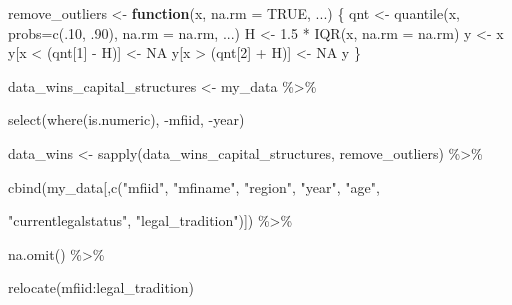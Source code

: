 \documentclass[a4paper,nobind]{templates/ociamthesis}
\newenvironment{Shaded}{\begin{snugshade}}{\end{snugshade}}
\newcommand{\AttributeTok}[1]{\textcolor[rgb]{0.77,0.63,0.00}{#1}}
\newcommand{\ConstantTok}[1]{\textcolor[rgb]{0.00,0.00,0.00}{#1}}
\newcommand{\ControlFlowTok}[1]{\textcolor[rgb]{0.13,0.29,0.53}{\textbf{#1}}}
\newcommand{\DecValTok}[1]{\textcolor[rgb]{0.00,0.00,0.81}{#1}}
\newcommand{\FloatTok}[1]{\textcolor[rgb]{0.00,0.00,0.81}{#1}}
\newcommand{\FunctionTok}[1]{\textcolor[rgb]{0.00,0.00,0.00}{#1}}
\newcommand{\NormalTok}[1]{#1}
\newcommand{\OtherTok}[1]{\textcolor[rgb]{0.56,0.35,0.01}{#1}}
\newcommand{\SpecialCharTok}[1]{\textcolor[rgb]{0.00,0.00,0.00}{#1}}
\newcommand{\StringTok}[1]{\textcolor[rgb]{0.31,0.60,0.02}{#1}}
\renewenvironment{Shaded}
{
  \vspace{10pt}%
  \begin{snugshade}%
}{%
  \end{snugshade}%
  \vspace{8pt}%
}
\begin{document}
\begin{Shaded}
\begin{Highlighting}[]
\NormalTok{remove\_outliers }\OtherTok{\textless{}{-}} \ControlFlowTok{function}\NormalTok{(x, }\AttributeTok{na.rm =} \ConstantTok{TRUE}\NormalTok{, ...) \{}
\NormalTok{  qnt }\OtherTok{\textless{}{-}} \FunctionTok{quantile}\NormalTok{(x, }\AttributeTok{probs=}\FunctionTok{c}\NormalTok{(.}\DecValTok{10}\NormalTok{, .}\DecValTok{90}\NormalTok{), }\AttributeTok{na.rm =}\NormalTok{ na.rm, ...)}
\NormalTok{  H }\OtherTok{\textless{}{-}} \FloatTok{1.5} \SpecialCharTok{*} \FunctionTok{IQR}\NormalTok{(x, }\AttributeTok{na.rm =}\NormalTok{ na.rm)}
\NormalTok{  y }\OtherTok{\textless{}{-}}\NormalTok{ x}
\NormalTok{  y[x }\SpecialCharTok{\textless{}}\NormalTok{ (qnt[}\DecValTok{1}\NormalTok{] }\SpecialCharTok{{-}}\NormalTok{ H)] }\OtherTok{\textless{}{-}} \ConstantTok{NA}
\NormalTok{  y[x }\SpecialCharTok{\textgreater{}}\NormalTok{ (qnt[}\DecValTok{2}\NormalTok{] }\SpecialCharTok{+}\NormalTok{ H)] }\OtherTok{\textless{}{-}} \ConstantTok{NA}
\NormalTok{  y}
\NormalTok{\}}


\NormalTok{data\_wins\_capital\_structures }\OtherTok{\textless{}{-}}\NormalTok{ my\_data }\SpecialCharTok{\%\textgreater{}\%} 
  
  \FunctionTok{select}\NormalTok{(}\FunctionTok{where}\NormalTok{(is.numeric), }\SpecialCharTok{{-}}\NormalTok{mfiid, }\SpecialCharTok{{-}}\NormalTok{year)}


\NormalTok{data\_wins }\OtherTok{\textless{}{-}} \FunctionTok{sapply}\NormalTok{(data\_wins\_capital\_structures, remove\_outliers) }\SpecialCharTok{\%\textgreater{}\%} 
  
  \FunctionTok{cbind}\NormalTok{(my\_data[,}\FunctionTok{c}\NormalTok{(}\StringTok{"mfiid"}\NormalTok{, }\StringTok{"mfiname"}\NormalTok{, }\StringTok{"region"}\NormalTok{, }\StringTok{"year"}\NormalTok{, }\StringTok{"age"}\NormalTok{, }
                   
                   \StringTok{"currentlegalstatus"}\NormalTok{, }\StringTok{"legal\_tradition"}\NormalTok{)]) }\SpecialCharTok{\%\textgreater{}\%} 
  
  \FunctionTok{na.omit}\NormalTok{() }\SpecialCharTok{\%\textgreater{}\%} 
  
  \FunctionTok{relocate}\NormalTok{(mfiid}\SpecialCharTok{:}\NormalTok{legal\_tradition)}
\end{Highlighting}
\end{Shaded}

\newpage
\end{document}
